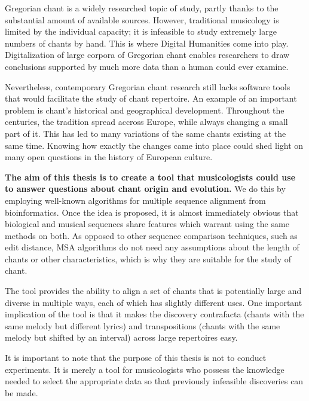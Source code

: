 Gregorian chant is a widely researched topic of study, partly thanks to the substantial amount of available sources. However, traditional
musicology is limited by the individual capacity; it is infeasible to study extremely large numbers of chants by hand. This is where
Digital Humanities come into play. Digitalization of large corpora of Gregorian chant enables researchers to draw conclusions
supported by much more data than a human could ever examine.

Nevertheless, contemporary Gregorian chant research still lacks software tools that would facilitate the study of chant repertoire. An example
of an important problem is chant's historical and geographical development. Throughout the 
centuries, the tradition spread accross Europe, while always changing a small part of it. This has led to many variations of the same
chants existing at the same time. Knowing how exactly the changes came into place could shed light on many open questions in the history of 
European culture.

\textbf{The aim of this thesis is to create a tool that musicologists could use to answer questions about chant origin and evolution.} We do this by employing
well-known algorithms for multiple sequence alignment from bioinformatics. Once the idea is proposed, it is almost immediately obvious that
biological and musical sequences share features which warrant using the same methods on both. As opposed to other sequence comparison techniques, such as edit
distance, MSA algorithms do not need any assumptions about the length of chants or other characteristics, which is why they are suitable
for the study of chant.


The tool provides the ability to align a set of chants that is potentially large and diverse in multiple ways, each of which has slightly different uses. One important
implication of the tool is that it makes the discovery contrafacta (chants with the same melody but different lyrics) and transpositions
(chants with the same melody but shifted by an interval) across large repertoires easy.

It is important to note that the purpose of this thesis is not to conduct experiments. It is merely a tool for musicologists who possess
the knowledge needed to select the appropriate data so that previously infeasible discoveries can be made.

